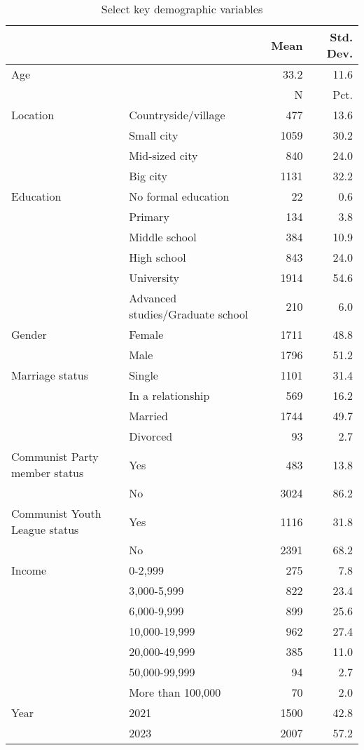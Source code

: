 \documentclass[
  number]{elsarticle}
\begin{document}
\begin{longtable}[t]{llrr}

\caption{\label{tbl-demographics}Select key demographic variables}

\tabularnewline

\toprule
  &    & Mean & Std. Dev.\\
\midrule
Age &  & 33.2 & 11.6\\
\midrule
 &  & N & Pct.\\
Location & Countryside/village & 477 & 13.6\\
 & Small city & 1059 & 30.2\\
 & Mid-sized city & 840 & 24.0\\
 & Big city & 1131 & 32.2\\
Education & No formal education & 22 & 0.6\\
 & Primary & 134 & 3.8\\
 & Middle school & 384 & 10.9\\
 & High school & 843 & 24.0\\
 & University & 1914 & 54.6\\
 & Advanced studies/Graduate school & 210 & 6.0\\
Gender & Female & 1711 & 48.8\\
 & Male & 1796 & 51.2\\
Marriage status & Single & 1101 & 31.4\\
 & In a relationship & 569 & 16.2\\
 & Married & 1744 & 49.7\\
 & Divorced & 93 & 2.7\\
Communist Party member status & Yes & 483 & 13.8\\
 & No & 3024 & 86.2\\
Communist Youth League status & Yes & 1116 & 31.8\\
 & No & 2391 & 68.2\\
Income & 0-2,999 & 275 & 7.8\\
 & 3,000-5,999 & 822 & 23.4\\
 & 6,000-9,999 & 899 & 25.6\\
 & 10,000-19,999 & 962 & 27.4\\
 & 20,000-49,999 & 385 & 11.0\\
 & 50,000-99,999 & 94 & 2.7\\
 & More than 100,000 & 70 & 2.0\\
Year & 2021 & 1500 & 42.8\\
 & 2023 & 2007 & 57.2\\
\bottomrule

\end{longtable}
\end{document}

